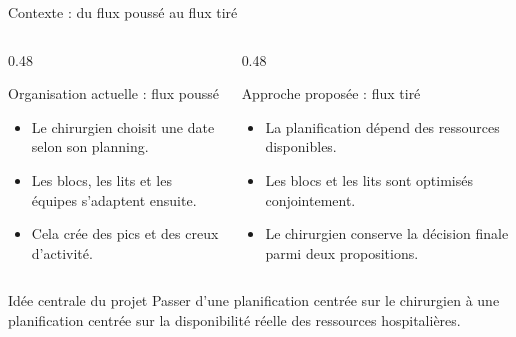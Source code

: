 \begin{frame}{Contexte : du flux poussé au flux tiré}

  \begin{columns}[T]

    \begin{column}{0.48\textwidth}

      \begin{block}{Organisation actuelle : flux poussé}
        \begin{itemize}
          \item Le chirurgien choisit une date selon son planning.
          \item Les blocs, les lits et les équipes s'adaptent ensuite.
          \item Cela crée des pics et des creux d'activité.
        \end{itemize}
      \end{block}

    \end{column}

    \begin{column}{0.48\textwidth}

      \begin{block}{Approche proposée : flux tiré}
        \begin{itemize}
          \item La planification dépend des ressources disponibles.
          \item Les blocs et les lits sont optimisés conjointement.
          \item Le chirurgien conserve la décision finale parmi deux propositions.
        \end{itemize}
      \end{block}

    \end{column}

  \end{columns}

  \vspace{0.4em}

  \begin{alertblock}{Idée centrale du projet}
    Passer d'une planification centrée sur le chirurgien à une planification centrée sur la disponibilité réelle des ressources hospitalières.
  \end{alertblock}

\end{frame}
